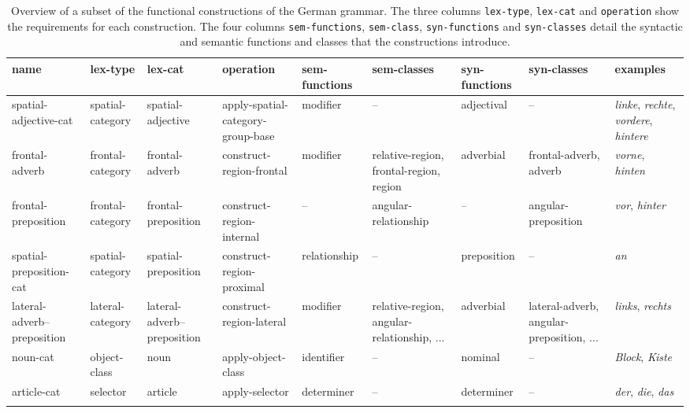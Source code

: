 \begin{table}
\begin{footnotesize}
\begin{tabularx}{\textwidth}{XXXXXXXXX}
\lsptoprule
name & lex-type & lex-cat & operation & sem-functions & sem-classes & syn-functions & syn-classes & examples 
\\ \midrule
spatial-adjective-cat  & spatial-category & spatial-adjective & apply-spatial-category-group-base &modifier & -- & adjectival & -- & \textit{linke}, \textit{rechte}, \textit{vordere}, \textit{hintere}
\\ \midrule
frontal-adverb  &frontal-category &frontal-adverb  & construct-region-frontal &modifier &relative-region, frontal-region, region &adverbial &frontal-adverb, adverb & \textit{vorne}, \textit{hinten} 
\\ \midrule
frontal-preposition  &frontal-category & frontal-preposition & construct-region-internal & -- & angular-relationship & -- & angular-preposition & \textit{vor}, \textit{hinter} 
\\ \midrule
spatial-preposition-cat  &spatial-category &spatial-preposition & construct-region-proximal &relationship & -- &preposition & -- & \textit{an}
\\ \midrule
lateral-adverb--preposition  &lateral-category &lateral-adverb--preposition & construct-region-lateral &modifier &relative-region, angular-relationship, ... &adverbial &lateral-adverb, angular-preposition, ... & \textit{links}, \textit{rechts}
\\ \midrule
noun-cat  &object-class &noun & apply-object-class &identifier & -- &nominal & -- & \textit{Block}, \textit{Kiste} 
\\ \midrule
article-cat  &selector &article & apply-selector &determiner & -- &determiner & -- & \textit{der}, \textit{die}, \textit{das} 
\\ \lspbottomrule
\end{tabularx}
\caption[Functional constructions]
{Overview of a subset of the functional constructions of the German grammar. 
The three columns {\footnotesize\tt lex-type},
{\footnotesize\tt lex-cat} and {\footnotesize\tt operation} show the requirements for each construction.
The four columns {\footnotesize\tt sem-functions}, {\footnotesize\tt sem-class}, {\footnotesize\tt syn-functions}
and {\footnotesize\tt syn-classes} detail the syntactic and semantic functions and classes that
the constructions introduce.}
\label{t:functional-constructions}
\end{footnotesize}
\end{table}
